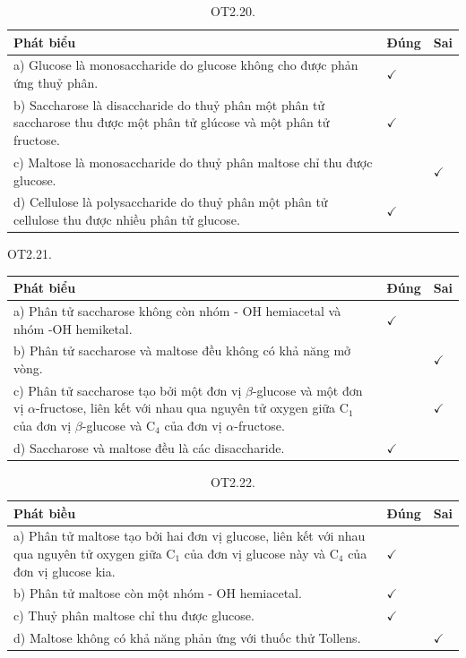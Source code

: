 \documentclass[10pt]{article}
\begin{document}
\begin{table}[h]
\begin{center}
\captionsetup{labelformat=empty}
\caption{OT2.20.}
\begin{tabular}{|l|l|l|}
\hline
Phát biểu & Đúng & Sai \\
\hline
a) Glucose là monosaccharide do glucose không cho được phản ứng thuỷ phân. & $\checkmark$ &  \\
\hline
b) Saccharose là disaccharide do thuỷ phân một phân tử saccharose thu được một phân tử glúcose và một phân tử fructose. & $\checkmark$ &  \\
\hline
c) Maltose là monosaccharide do thuỷ phân maltose chỉ thu được glucose. &  & $\checkmark$ \\
\hline
d) Cellulose là polysaccharide do thuỷ phân một phân tử cellulose thu được nhiều phân tử glucose. & $\checkmark$ &  \\
\hline
\end{tabular}
\end{center}
\end{table}

OT2.21.

\begin{center}
\begin{tabular}{|l|l|l|}
\hline
Phát biểu & Đúng & Sai \\
\hline
a) Phân tử saccharose không còn nhóm - OH hemiacetal và nhóm -OH hemiketal. & $\checkmark$ &  \\
\hline
b) Phân tử saccharose và maltose đều không có khả năng mở vòng. &  & $\checkmark$ \\
\hline
c) Phân tử saccharose tạo bởi một đơn vị $\beta$-glucose và một đơn vị $\alpha$-fructose, liên kết với nhau qua nguyên tử oxygen giữa $\mathrm{C}_{1}$ của đơn vị $\beta$-glucose và $\mathrm{C}_{4}$ của đơn vị $\alpha$-fructose. &  & $\checkmark$ \\
\hline
d) Saccharose và maltose đều là các disaccharide. & $\checkmark$ &  \\
\hline
\end{tabular}
\end{center}

\begin{table}[h]
\begin{center}
\captionsetup{labelformat=empty}
\caption{OT2.22.}
\begin{tabular}{|l|l|l|}
\hline
Phát biều & Đúng & Sai \\
\hline
a) Phân tử maltose tạo bởi hai đơn vị glucose, liên kết với nhau qua nguyên tử oxygen giữa $\mathrm{C}_{1}$ của đơn vị glucose này và $\mathrm{C}_{4}$ của đơn vị glucose kia. & $\checkmark$ &  \\
\hline
b) Phân tử maltose còn một nhóm - OH hemiacetal. & $\checkmark$ &  \\
\hline
c) Thuỷ phân maltose chỉ thu được glucose. & $\checkmark$ &  \\
\hline
d) Maltose không có khả năng phản ứng với thuốc thử Tollens. &  & $\checkmark$ \\
\hline
\end{tabular}
\end{center}
\end{table}
\end{document}
